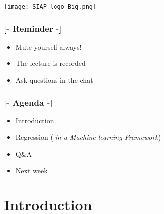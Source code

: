 \documentclass[xcolor=x11names,compress, aspectratio=169]{beamer}
\renewcommand{\(}{\begin{columns}}
\renewcommand{\)}{\end{columns}}
\newcommand{\<}[1]{\begin{column}{#1}}
\renewcommand{\>}{\end{column}}
\begin{document}


\begin{frame}
\Large{ \color{siap}{Machine Learning for Official Statistics and SDGs}}

\hspace{1cm}


\hspace{2cm}
\begin{center}

\texttt{[image: SIAP\_logo\_Big.png]}

\end{center}
\end{frame}



\begin{frame} %
\frametitle{\textcolor{brique}{[-  \textbf{Reminder} -]}}
\begin{itemize}[<+-|alert@+>]
   \item Mute yourself \textcolor{brique}{always}!
   \item The lecture is recorded
   \item Ask questions in the chat
\end{itemize}
\end{frame}

\begin{frame} %
\frametitle{\textcolor{brique}{[-  \textbf{Agenda} -]}}
\begin{itemize}[<+-|alert@+>]
   \item Introduction
   \item Regression (\emph{ in a Machine learning Framework})
   \item Q\&A
   \item Next week
\end{itemize}
\end{frame}


\section{Introduction}
\end{document}
